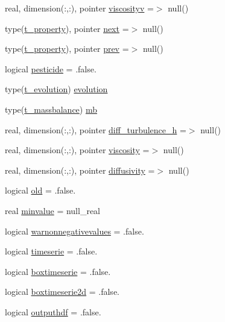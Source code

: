 \begin{DoxyCompactItemize}
\item 
real, dimension(\+:,\+:), pointer \mbox{\hyperlink{structmodulerunoffproperties_1_1t__property_a2cae3113e9648711b03c07f36f75c0cb}{viscosityv}} =$>$ null()
\item 
type(\mbox{\hyperlink{structmodulerunoffproperties_1_1t__property}{t\+\_\+property}}), pointer \mbox{\hyperlink{structmodulerunoffproperties_1_1t__property_acf6cd4074343c9a7d685dde192f389ea}{next}} =$>$ null()
\item 
type(\mbox{\hyperlink{structmodulerunoffproperties_1_1t__property}{t\+\_\+property}}), pointer \mbox{\hyperlink{structmodulerunoffproperties_1_1t__property_a4eefb1f3ee5d8416678f0507e46652b7}{prev}} =$>$ null()
\item 
logical \mbox{\hyperlink{structmodulerunoffproperties_1_1t__property_a75566b8ca538a5fd791ed8bc18e35632}{pesticide}} = .false.
\item 
type(\mbox{\hyperlink{structmodulerunoffproperties_1_1t__evolution}{t\+\_\+evolution}}) \mbox{\hyperlink{structmodulerunoffproperties_1_1t__property_ae1e5d42cb6f81df2be2d92a37e0152cd}{evolution}}
\item 
type(\mbox{\hyperlink{structmodulerunoffproperties_1_1t__massbalance}{t\+\_\+massbalance}}) \mbox{\hyperlink{structmodulerunoffproperties_1_1t__property_a5e1d3f01506af8c40feb4ecb416962b5}{mb}}
\item 
real, dimension(\+:,\+:), pointer \mbox{\hyperlink{structmodulerunoffproperties_1_1t__property_a8c58649d9bc5612e7e52ea3364f2ef46}{diff\+\_\+turbulence\+\_\+h}} =$>$ null()
\item 
real, dimension(\+:,\+:), pointer \mbox{\hyperlink{structmodulerunoffproperties_1_1t__property_aef9d4d49f6a98488de4d5f092bf3f8a9}{viscosity}} =$>$ null()
\item 
real, dimension(\+:,\+:), pointer \mbox{\hyperlink{structmodulerunoffproperties_1_1t__property_af3c81cd3280b74b539518ec41ac4e6b0}{diffusivity}} =$>$ null()
\item 
logical \mbox{\hyperlink{structmodulerunoffproperties_1_1t__property_adbd1370195e830f5a4ec9a5cfad0d33b}{old}} = .false.
\item 
real \mbox{\hyperlink{structmodulerunoffproperties_1_1t__property_a36ea675a078668b1da5360b11772c622}{minvalue}} = null\+\_\+real
\item 
logical \mbox{\hyperlink{structmodulerunoffproperties_1_1t__property_aa634405b3aa5fb1dc64f6fcb04bd7128}{warnonnegativevalues}} = .false.
\item 
logical \mbox{\hyperlink{structmodulerunoffproperties_1_1t__property_a3eff1e00ff851e87e105e7bfc60646cc}{timeserie}} = .false.
\item 
logical \mbox{\hyperlink{structmodulerunoffproperties_1_1t__property_aa7d5552da8feaa8aba88d7fe7eb2002f}{boxtimeserie}} = .false.
\item 
logical \mbox{\hyperlink{structmodulerunoffproperties_1_1t__property_a35700c9fad1981e57cd5eec935b86334}{boxtimeserie2d}} = .false.
\item 
logical \mbox{\hyperlink{structmodulerunoffproperties_1_1t__property_aab3ddc6105af122b03c065b32450b03c}{outputhdf}} = .false.
\end{DoxyCompactItemize}


